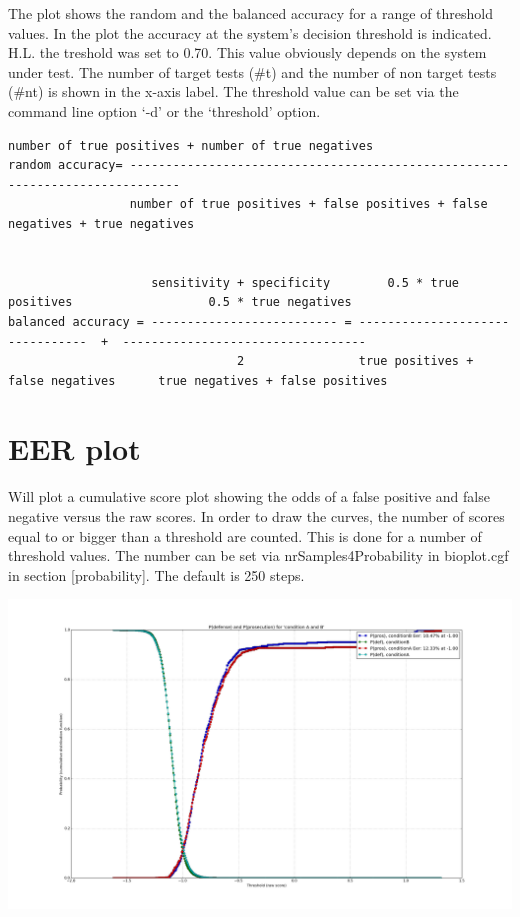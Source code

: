 \documentclass[letterpaper,10pt,english]{sphinxmanual}
\begin{document}
The plot shows the random and the balanced accuracy for a range of threshold values.
In the plot the accuracy at the system's decision threshold is indicated. H.L. the treshold was set to 0.70.
This value obviously depends on the system under test. The number of target tests (\#t) and the number of non target tests (\#nt) is shown in the x-axis label.
The threshold value can be set via the command line option `-d' or the `threshold' option.

\begin{Verbatim}[commandchars=\\\{\}]
                          number of true positives + number of true negatives
random accuracy= -----------------------------------------------------------------------------
                 number of true positives + false positives + false negatives + true negatives


                    sensitivity + specificity        0.5 * true positives                   0.5 * true negatives
balanced accuracy = -------------------------- = --------------------------------  +  ----------------------------------
                                2                true positives + false negatives      true negatives + false positives
\end{Verbatim}


\chapter{EER plot}
\label{eerplot:eer-plot}\label{eerplot::doc}\label{eerplot:eerplot-label}
Will plot a cumulative score plot showing the odds of a false positive and false negative
versus the raw scores. In order to draw the curves, the number of scores equal to or bigger than
a threshold are counted. This is done for a number of threshold values. The number can be set via
nrSamples4Probability in bioplot.cgf in section {[}probability{]}. The default is 250 steps.

\includegraphics{images/condition_A_and_B_eer_plot.png}
\end{document}
